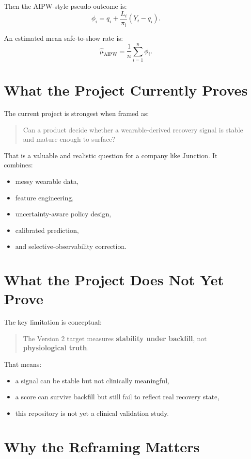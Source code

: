 \documentclass[11pt]{article}
\begin{document}
Then the AIPW-style pseudo-outcome is:
\[
\phi_i = q_i + \frac{L_i}{\pi_i}(Y_i - q_i).
\]

An estimated mean safe-to-show rate is:
\[
\hat{\mu}_{\text{AIPW}} = \frac{1}{n}\sum_{i=1}^n \phi_i.
\]

\section{What the Project Currently Proves}

The current project is strongest when framed as:
\begin{quote}
Can a product decide whether a wearable-derived recovery signal is stable and mature enough to surface?
\end{quote}

That is a valuable and realistic question for a company like Junction. It combines:
\begin{itemize}[leftmargin=1.5em]
    \item messy wearable data,
    \item feature engineering,
    \item uncertainty-aware policy design,
    \item calibrated prediction,
    \item and selective-observability correction.
\end{itemize}

\section{What the Project Does Not Yet Prove}

The key limitation is conceptual:
\begin{quote}
The Version 2 target measures \textbf{stability under backfill}, not \textbf{physiological truth}.
\end{quote}

That means:
\begin{itemize}[leftmargin=1.5em]
    \item a signal can be stable but not clinically meaningful,
    \item a score can survive backfill but still fail to reflect real recovery state,
    \item this repository is not yet a clinical validation study.
\end{itemize}

\section{Why the Reframing Matters}
\end{document}
